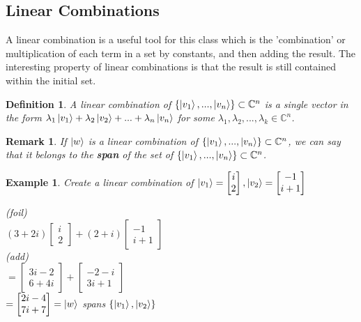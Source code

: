 \documentclass[12pt]{article}
\theoremstyle{plain}
\theoremstyle{nonumberplain}
\theoremstyle{plain}
\newtheorem{definition}[lemma]{Definition}
\newtheorem{example}[lemma]{Example}
\newtheorem{remark}[lemma]{Remark}
\theoremstyle{nonumberplain}
\newcommand\1{{\bf 1}}
\newcommand{\bmat}[1]{\begin{bmatrix*} #1 \end{bmatrix*}} %
\newcommand{\C}{\mathbb{C}} %
\newcommand{\<}{\left\langle}
\renewcommand{\>}{\right\rangle}
\begin{document}

\subsection{Linear Combinations}
A linear combination is a useful tool for this class which is the 'combination' or multiplication of each term in a set by constants, and then adding the result. The interesting property of linear combinations is that the result is still contained within the initial set.

\begin{definition}\label{def:li}
A linear combination of $\lbrace\ket{v_1}, ..., \ket{v_n}\rbrace\subset\C^n$ is a single vector in the form $\lambda_1\ket{v_1} + \lambda_2\ket{v_2} + ... + \lambda_n\ket{v_n}$ for some $\lambda_1, \lambda_2, ... , \lambda_k\in\C^n$.
\end{definition}

\begin{remark}
If $\ket{w}$ is a linear combination of $\lbrace\ket{v_1}, ..., \ket{v_n}\rbrace\subset\C^n$, we can say that it belongs to the \textbf{span} of the set of $\lbrace\ket{v_1}, ..., \ket{v_n}\rbrace\subset\C^n$.
\end{remark}

\begin{example}
Create a linear combination of $\ket{v_1}=\bmat{i \\ 2}, \ket{v_2}=\bmat{-1 \\ i+1}$
\begin{center}
(\textit{foil}) \\
$(3+2i)\bmat{i \\ 2} + (2+i)\bmat{-1 \\ i+1}$ \\
(\textit{add}) \\
$=\bmat{3i-2 \\ 6+4i} + \bmat{-2-i \\ 3i+1}$ \\
$=\bmat{2i-4 \\ 7i+7}=\ket{w}$ \textit{spans} $\lbrace\ket{v_1}, \ket{v_2}\rbrace$
\end{center}
\end{example}

\end{document}
